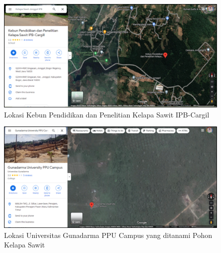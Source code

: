 \begin{figure}[H]
	\vspace{-0.1cm}
	\begin{center}
		\includegraphics[width=1\columnwidth]{bab3/Gambar/Picture2.png}
	\end{center}
	\vspace{-0.2cm}
	\captionsetup{justification=centering}
	\caption{Lokasi Kebun Pendidikan dan Penelitian Kelapa Sawit IPB-Cargil}\label{img:Lokasi-Kebun-IPB}
\end{figure}

\begin{figure}[H]
	\vspace{-0.1cm}
	\begin{center}
		\includegraphics[width=1\columnwidth]{bab3/Gambar/Picture3.png}
	\end{center}
	\vspace{-0.2cm}
	\captionsetup{justification=centering}
	\caption{Lokasi Universitas Gunadarma PPU Campus yang ditanami Pohon Kelapa Sawit}\label{img:Lokasi-Gunadarma}
\end{figure}

